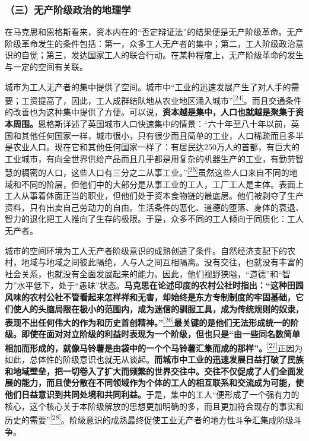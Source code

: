 \documentclass[UTF8, fontset = sourcesans, a4paper, oneside, zihao =
-4, scheme=chinese, no-math, space=true]{ctexbook}
\begin{document}
\subsubsection{（三）无产阶级政治的地理学}\label{part0010_split_002.htmlux5cux23d037}

在马克思和恩格斯看来，资本内在的``否定辩证法''的结果便是无产阶级革命。无产阶级革命发生的条件包括：第一，众多工人无产者的集中；第二，工人阶级政治意识的自觉；第三，发达国家工人的联合行动。在某种程度上，无产阶级革命的发生与一定的空间有关联。

城市为工人无产者的集中提供了空间。城市中``工业的迅速发展产生了对人手的需要；工资提高了，因此，工人成群结队地从农业地区涌入城市''\protect\hypertarget{part0010_split_002.htmlux5cux23w24}{}{}\protect\hyperlink{part0010_split_002.htmlux5cux23m24}{\textsuperscript{{[}24{]}}}。而且交通条件的改善也为这种集中提供了方便。可以说，\textbf{资本越是集中，人口也就越是聚集于资本周围。}恩格斯详述了英国城市人口快速集中的情景：``六十年至八十年以前，英国和其他任何国家一样，城市很小，只有很少而且简单的工业，人口稀疏而且多半是农业人口。现在它和其他任何国家一样了：有居民达250万人的首都，有巨大的工业城市，有向全世界供给产品而且几乎都是用复杂的机器生产的工业，有勤劳智慧的稠密的人口，这些人口有三分之二从事工业。''\protect\hypertarget{part0010_split_002.htmlux5cux23w25}{}{}\protect\hyperlink{part0010_split_002.htmlux5cux23m25}{\textsuperscript{{[}25{]}}}虽然这些人口来自不同的地域和不同的阶层，但他们中的大部分是从事工业的工人，工厂工人是主体。表面上工人从事着体面正当的职业，但他们处于资本食物链的最底层。他们被剥夺了生产资料，只有出卖自己劳动力的自由。生活条件的恶化、道德的堕落、身体的衰退、智力的退化把工人推向了生存的极限。于是，众多不同的工人倾向于同质化：工人无产者。

城市的空间环境为工人无产者阶级意识的成熟创造了条件。自然经济支配下的农村，地域与地域之间彼此隔绝，人与人之间互相隔离。没有交往，也就没有丰富的社会关系，也就没有全面发展起来的能力。因此，他们视野狭隘，``道德''和``智力''水平低下，处于``愚昧''状态。\textbf{马克思在论述印度的农村公社时指出：``这种田园风味的农村公社不管看起来怎样祥和无害，却始终是东方专制制度的牢固基础，它们使人的头脑局限在极小的范围内，成为迷信的驯服工具，成为传统规则的奴隶，表现不出任何伟大的作为和历史首创精神。''}\protect\hypertarget{part0010_split_002.htmlux5cux23w26}{}{}\protect\hyperlink{part0010_split_002.htmlux5cux23m26}{\textsuperscript{{[}26{]}}}\textbf{最关键的是他们无法形成统一的阶级。即使在面对对立阶级的利益时表现为一个阶级，但也只是``由一些同名数简单相加而形成的，就像马铃薯是由袋中的一个个马铃薯汇集而成的那样''。}\protect\hypertarget{part0010_split_002.htmlux5cux23w27}{}{}\protect\hyperlink{part0010_split_002.htmlux5cux23m27}{\textsuperscript{{[}27{]}}}正因为如此，总体性的阶级意识也就无从谈起。\textbf{而城市中工业的迅速发展日益打破了民族和地域壁垒，把一切卷入了扩大而频繁的世界交往中。交往不仅促成了人们全面发展的能力，而且使分散在不同领域作为个体的工人的相互联系和交流成为可能，使他们日益意识到共同处境和共同利益。}于是，集中的工人``便形成了一个强有力的核心，这个核心关于本阶级解放的思想更加明确的多，而且更加符合现存的事实和历史的需要''\protect\hypertarget{part0010_split_002.htmlux5cux23w28}{}{}\protect\hyperlink{part0010_split_002.htmlux5cux23m28}{\textsuperscript{{[}28{]}}}。阶级意识的成熟最终促使工业无产者的地方性斗争汇集成阶级斗争。
\end{document}
